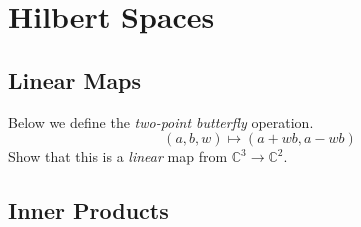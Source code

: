 
\chapter{Hilbert Spaces}


\section{Linear Maps}

\begin{example}
Below we define the \textit{two-point butterﬂy} operation.
$$(a,b,w) \mapsto (a + wb, a-wb)$$
Show that this is a \textit{linear} map from $\mathbb{C}^3 \rightarrow \mathbb{C}^2$. 
\end{example}

\section{Inner Products}